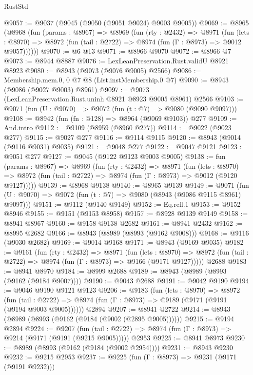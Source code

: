\begin{lexlean}{RustStd}
\begin{coremodule}
{\begin{coremodule}
{{{{{{{{{{{{{{{{{{{{{{{{{{{{{{{{{{{{{{{@9057 := @9037 (@9045 (@9050 (@9051 @9024) @9003 @9005))
@9069 := @8965
    (@8968
      (fun (params : @8967) =>
      @8969
        (fun (rty : @2432) =>
        @8971
          (fun (lets : @8970) =>
          @8972 (fun (tail : @2722) => @8974 (fun (Γ : @8973) => @9012 @9057))))))
@9070 := @6 @13
@9071 := @8966 @9070
@9072 := @8966 @7
@9073 := @8944 @8887
@9076 := LexLeanPreservation.Rust.validU @8921 @8923
@9080 := @8943 (@9073 (@9076 @9005) @2566)
@9086 := Membership.mem.{0, 0} @7 @8 (List.instMembership.{0} @7)
@9090 := @8943 (@9086 (@9027 @9003) @8961)
@9097 := @9073 (LexLeanPreservation.Rust.uninh @8921 @8923 @9005 @8961) @2566
@9103 := @9071 (fun (U : @9070) => @9072 (fun (t : @7) => @9080 (@9090 @9097)))
@9108 := @8942 (fun (fn : @128) => @8964 (@9069 @9103)) @277
@9109 := And.intro
@9112 := @9109 (@8959 (@8960 @277))
@9114 := @9022 (@9023 @277)
@9115 := @9027 @277
@9116 := @9114 @9115
@9120 := @8943 (@9014 (@9116 @9031) @9035)
@9121 := @9048 @277
@9122 := @9047 @9121
@9123 := @9051 @277
@9127 := @9045 (@9122 @9123 @9003 @9005)
@9138 := fun (params : @8967) =>
  @8969
    (fun (rty : @2432) =>
    @8971
      (fun (lets : @8970) =>
      @8972 (fun (tail : @2722) => @8974 (fun (Γ : @8973) => @9012 (@9120 @9127)))))
@9139 := @8968 @9138
@9140 := @8965 @9139
@9149 := @9071 (fun (U : @9070) => @9072 (fun (t : @7) => @9080 (@8943 (@9086 @9115 @8961) @9097)))
@9151 := @9112 (@9140 @9149)
@9152 := Eq.refl.{1}
@9153 := @9152 @8946
@9155 := @9151 (@9153 @8958)
@9157 := @8928 @9139 @9149
@9158 := @8941 @8967
@9160 := @9158 @9138 @2682
@9161 := @8941 @2432
@9162 := @8995 @2682
@9166 := @8943 (@8989 (@8993 (@9162 @9008)))
@9168 := @9116 (@9030 @2682)
@9169 := @9014 @9168
@9171 := @8943 (@9169 @9035)
@9182 := @9161
    (fun (rty : @2432) =>
    @8971
      (fun (lets : @8970) =>
      @8972 (fun (tail : @2722) => @8974 (fun (Γ : @8973) => @9166 (@9171 @9127)))))
    @2688
@9183 := @8941 @8970
@9184 := @8999 @2688
@9189 := @8943 (@8989 (@8993 (@9162 (@9184 @9007))))
@9190 := @9043 @2688
@9191 := @9042 @9190
@9194 := @9046 @9190 @9121 @9123
@9206 := @9183
    (fun (lets : @8970) =>
    @8972
      (fun (tail : @2722) => @8974 (fun (Γ : @8973) => @9189 (@9171 (@9191 (@9194 @9003 @9005))))))
    @2894
@9207 := @8941 @2722
@9214 := @8943 (@8989 (@8993 (@9162 (@9184 (@9002 (@2895 @9005))))))
@9215 := @9194 @2894
@9224 := @9207
    (fun (tail : @2722) => @8974 (fun (Γ : @8973) => @9214 (@9171 (@9191 (@9215 @9005)))))
    @2953
@9225 := @8941 @8973
@9230 := @8989 (@8993 (@9162 (@9184 (@9002 @2954))))
@9231 := @8943 @9230
@9232 := @9215 @2953
@9237 := @9225 (fun (Γ : @8973) => @9231 (@9171 (@9191 @9232)))
}}}}}}}}}}}}}}}}}}}}}}}}}}}}}}}}}}}}}}}
\end{coremodule}}
\end{coremodule}
\end{lexlean}

